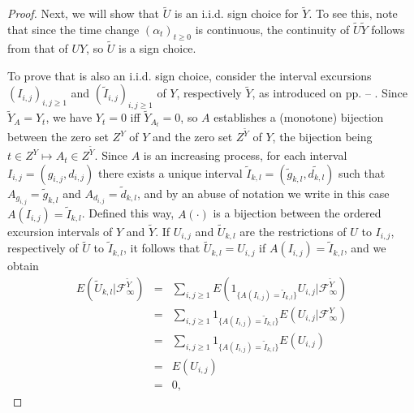 \documentclass[reqno]{amsart}
\theoremstyle{definition}
\theoremstyle{remark}
\numberwithin{equation}{section}
\begin{document}
\begin{proof}
Next, we will show that $\widetilde{U}$ is an i.i.d. sign choice for $\widetilde{Y}$. To see this, note that since the time change $(\alpha_{t})_{t\ge0}$ is continuous, the continuity of $\widetilde{U}\widetilde{Y}$ follows from that of $UY$, so $\widetilde{U}$ is a sign choice.

\label{pagina de referinta start corespondenta A}
To prove that is also an i.i.d. sign choice, consider the interval excursions $(I_{i,j})_{i,j\ge1}$ and $(\widetilde{I}_{i,j})_{i,j\ge1}$ of $Y$, respectively $\widetilde{Y}$, as introduced on pp. \pageref{sign choice} -- \pageref{iid sign choice}. Since $\widetilde{Y}_{A}=Y_t$, we have $Y_t=0$ iff $\widetilde{Y}_{A_t}=0$, so $A$ establishes a (monotone) bijection between the zero set $Z^Y$ of $Y$ and the zero set $Z^{\widetilde{Y}}$ of $Y$, the bijection being $t\in Z^Y\mapsto A_t\in Z^{\widetilde{Y}}$. Since $A$ is an increasing process, for each interval $I_{i,j}=(g_{i,j},d_{i,j})$ there exists a unique interval $\widetilde{I}_{k,l}=(\widetilde{g}_{k,l},\widetilde{d_{k,l}})$ such that $A_{g_{i,j}}=\widetilde{g}_{k,l}$ and $A_{d_{i,j}}=\widetilde{d}_{k,l}$, and by an abuse of notation we write in this case $A({I_{i,j}})=\widetilde{I}_{k,l}$. Defined this way, $A(\cdot)$ is a bijection between the ordered excursion intervals of $Y$ and $\widetilde{Y}$. If $U_{i,j}$ and $\widetilde{U}_{k,l}$ are the restrictions of $U$ to $I_{i,j}$, respectively of $\widetilde{U}$ to $\widetilde{I}_{k,l}$, it follows that $\widetilde{U}_{k,l}=U_{i,j}$ if $A(I_{i,j})=\widetilde{I}_{k,l}$, and we obtain
\begin{eqnarray*}
E\left(\widetilde{U}_{k,l} \vert \mathcal{F}_{\infty}^{\widetilde Y}\right)&=&\sum_{i,j\ge 1}E\left(1_{\{A(I_{i,j})=\widetilde{I}_{k,l}\}}{U}_{i,j}\vert \mathcal{F}_{\infty}^{\widetilde{Y}}\right)\\
&=&\sum_{i,j\ge 1}1_{\{A(I_{i,j})=\widetilde{I}_{k,l}\}} E\left({U}_{i,j}\vert \mathcal{F}_{\infty}^{{Y}}\right)\\
&=&\sum_{i,j\ge 1}1_{\{A(I_{i,j})=\widetilde{I}_{k,l}\}} E\left({U}_{i,j}\right)\\
&=&E\left({U}_{i,j}\right)\\
&=&0,
\end{eqnarray*}

\end{proof}
\end{document}
